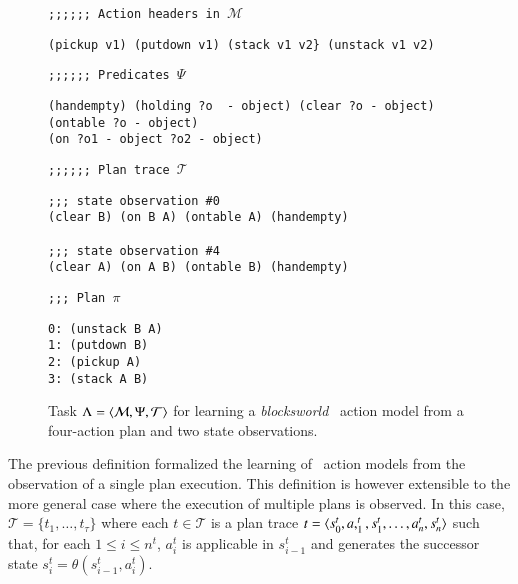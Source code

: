 \begin{figure}[hbt!]
{\footnotesize\tt ;;;;;; Action headers in $\mathcal{M}$}  
\begin{footnotesize}  
\begin{verbatim}
(pickup v1) (putdown v1) (stack v1 v2} (unstack v1 v2)
\end{verbatim}
\end{footnotesize}
\vspace{0.2cm}
{\footnotesize\tt ;;;;;; Predicates $\Psi$}
\begin{footnotesize}
\begin{verbatim}
(handempty) (holding ?o  - object) (clear ?o - object) (ontable ?o - object)
(on ?o1 - object ?o2 - object)
\end{verbatim}
\end{footnotesize}
\vspace{0.2cm}
{\footnotesize\tt ;;;;;; Plan trace $\mathcal{T}$}
\begin{footnotesize}
\begin{verbatim}
;;; state observation #0
(clear B) (on B A) (ontable A) (handempty)

;;; state observation #4
(clear A) (on A B) (ontable B) (handempty)
\end{verbatim}
\end{footnotesize}

{\footnotesize\tt ;;; Plan $\pi$}
\begin{footnotesize}
\begin{verbatim}
0: (unstack B A)
1: (putdown B)
2: (pickup A)
3: (stack A B)
\end{verbatim}
\end{footnotesize}
 \caption{\small Task $\Lambda={\langle \mathcal{M},\Psi,\mathcal{T} \rangle}$ for learning a {\em blocksworld} \strips\ action model from a four-action plan and two state observations.}
\label{fig:example-plans}
\end{figure}


The previous definition formalized the learning of \strips\ action models from the observation of a single plan execution. This definition is however extensible to the more general case where the execution of multiple plans is observed. In this case, $\mathcal{T}=\{t_1,\ldots,t_{\tau}\}$ where each $t\in \mathcal{T}$ is a plan trace $t={\langle s_0^t,a,_1^t,s_1^t,\ldots,a_n^t,s_{n}^t \rangle}$ such that, for each {\small $1\leq i\leq n^t$}, $a_i^t$ is applicable in $s_{i-1}^t$ and generates the successor state $s_i^t=\theta(s_{i-1}^t,a_i^t)$.



